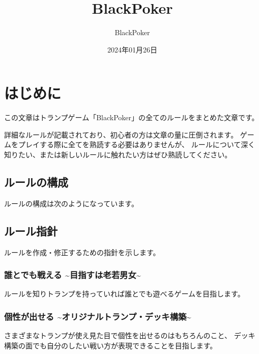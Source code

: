\documentclass[letterpaper,10pt,dvipdfmx]{sphinxmanual}
\title{BlackPoker}
\date{2024年01月26日}
\author{BlackPoker}
\begin{document}
\pagestyle{empty}
\sphinxmaketitle
\pagestyle{plain}
\sphinxtableofcontents
\pagestyle{normal}
\label{\detokenize{index::doc}}
\ignorespaces 


\sphinxstepscope


\chapter{はじめに}
\label{\detokenize{init/init:id1}}\label{\detokenize{init/init::doc}}
\sphinxAtStartPar
この文章はトランプゲーム「BlackPoker」の全てのルールをまとめた文章です。

\sphinxAtStartPar
詳細なルールが記載されており、初心者の方は文章の量に圧倒されます。
ゲームをプレイする際に全てを熟読する必要はありませんが、
ルールについて深く知りたい、または新しいルールに触れたい方はぜひ熟読してください。


\section{ルールの構成}
\label{\detokenize{init/init:id2}}
\sphinxAtStartPar
ルールの構成は次のようになっています。

\noindent{}


\section{ルール指針}
\label{\detokenize{init/init:id3}}
\sphinxAtStartPar
ルールを作成・修正するための指針を示します。


\subsection{誰とでも戦える \textasciitilde{}目指すは老若男女\textasciitilde{}}
\label{\detokenize{init/init:id4}}
\sphinxAtStartPar
ルールを知りトランプを持っていれば誰とでも遊べるゲームを目指します。


\subsection{個性が出せる \textasciitilde{}オリジナルトランプ・デッキ構築\textasciitilde{}}
\label{\detokenize{init/init:id5}}
\sphinxAtStartPar
さまざまなトランプが使え見た目で個性を出せるのはもちろんのこと、
デッキ構築の面でも自分のしたい戦い方が表現できることを目指します。
\end{document}
